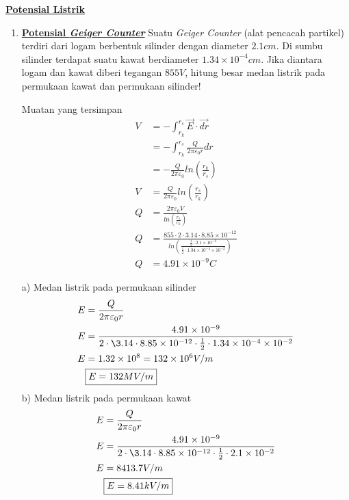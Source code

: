 \pagebreak
\noindent \underline{\textbf{Potensial Listrik}}
\vskip 10pt
\begin{enumerate}
    \item \underline{\textbf{Potensial \textit{Geiger Counter}}}
    \vskip5pt
    Suatu \textit{Geiger Counter} (alat pencacah partikel) terdiri dari logam berbentuk silinder dengan diameter $2.1cm$. Di sumbu silinder terdapat suatu kawat berdiameter $1.34\times10^{-4}cm$. Jika diantara logam dan kawat diberi tegangan $855V$, hitung besar medan listrik pada permukaan kawat dan permukaan silinder!
    \vskip8pt
    \begin{minipage}{0.3\textwidth}
    Muatan yang tersimpan
    \begin{align*}
        V&=-\int_{r_{k}}^{r_{s}}\vec{E}\cdot\vec{dr} \\
        &=-\int_{r_{k}}^{r_{s}}\frac{Q}{2\pi\varepsilon_{0}r}dr \\
        &=-\frac{Q}{2\pi\varepsilon_{0}}ln\left ( \frac{r_{k}}{r_{s}} \right )\\
        V&=\frac{Q}{2\pi\varepsilon_{0}}ln\left ( \frac{r_{s}}{r_{k}} \right )\\
        Q &= \frac{2\pi\varepsilon_{0}V}{ln\left ( \frac{r_{s}}{r_{k}} \right )}\\
        Q &= \frac{855\cdot2\cdot3.14\cdot8.85\times10^{-12}}{ln\left ( \frac{\frac{1}{2}\cdot2.1\times10^{-2}}{\frac{1}{2}\cdot1.34\times10^{-4}\times10^{-2}} \right )}\\
        Q &= 4.91\times10^{-9}C
    \end{align*}
    \end{minipage}
    \hfill
    \begin{minipage}{0.6\textwidth}
    a) Medan listrik pada permukaan silinder
        \begin{align*}
        E&=\frac{Q}{2\pi\varepsilon_{0}r}\\
        E&=\frac{4.91\times10^{-9}}{2\cdot\3.14\cdot8.85\times10^{-12}\cdot\frac{1}{2}\cdot1.34\times10^{-4}\times10^{-2}}\\
        E&=1.32\times10^{8}=132\times10^{6}V/m\\
        &\fbox{$E=132MV/m$}
        \end{align*}
    b) Medan listrik pada permukaan kawat
        \begin{align*}
        E&=\frac{Q}{2\pi\varepsilon_{0}r}\\
        E&=\frac{4.91\times10^{-9}}{2\cdot\3.14\cdot8.85\times10^{-12}\cdot\frac{1}{2}\cdot2.1\times10^{-2}}\\
        E&=8413.7V/m\\
        &\fbox{$E=8.41kV/m$}
        \end{align*}
    \end{minipage}



\end{enumerate}
